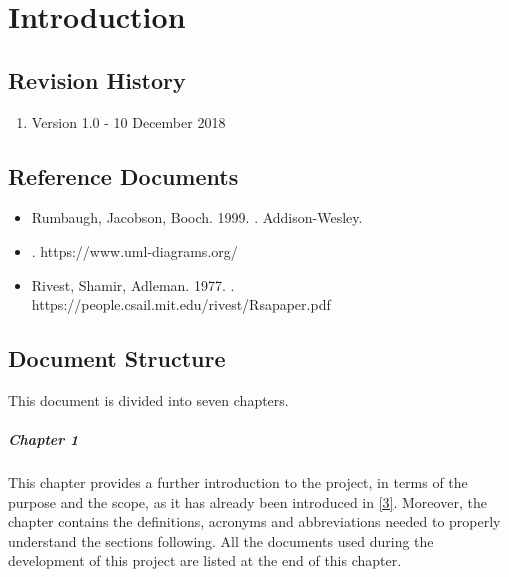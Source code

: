 \documentclass[../DD.tex]{subfiles}
\begin{document}
\chapter{Introduction}
\thispagestyle{fancy}
		
		
		
		
		
		\section{Revision History}
		\begin{enumerate}
			\item Version 1.0 - 10 December 2018
		\end{enumerate}
		
		\section{Reference Documents\label{sect:1.5}}
			\begin{itemize}
				\item Rumbaugh, Jacobson, Booch. 1999. . Addison-Wesley.
				\item {}. https://www.uml-diagrams.org/
				\item Rivest, Shamir, Adleman. 1977. . https://people.csail.mit.edu/rivest/Rsapaper.pdf
			\end{itemize}
			
		\section{Document Structure}
		This document is divided into seven chapters.
		
		\paragraph{Chapter 1}
			This chapter provides a further introduction to the project, in terms of the purpose and the scope, as it has already been introduced in \hyperref[ref:3]{[3]}. Moreover, the chapter contains the definitions, acronyms and abbreviations needed to properly understand the sections following. All the documents used during the development of this project are listed at the end of this chapter.
\end{document}
